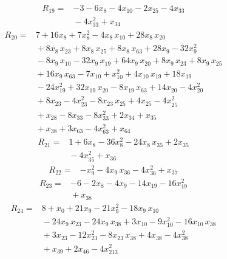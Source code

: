 \documentclass[11pt]{article}
\begin{document}
\begin{equation*}\begin{aligned}
R_{19}={}&-3 - 6x_{8} - 4x_{10} - 2x_{25} - 4x_{33} \\
&{} - 4x_{33}^{2} + x_{34}
\end{aligned}\end{equation*}
\begin{equation*}\begin{aligned}
R_{20}={}&7 + 16x_{8} + 7x_{8}^{2} - 4x_{8}\,x_{10} + 28x_{8}\,x_{20} \\
&{} + 8x_{8}\,x_{23} + 8x_{8}\,x_{25} + 8x_{8}\,x_{63} + 28x_{9} - 32x_{9}^{2} \\
&{} - 8x_{9}\,x_{10} - 32x_{9}\,x_{19} + 64x_{9}\,x_{20} + 8x_{9}\,x_{23} + 8x_{9}\,x_{25} \\
&{} + 16x_{9}\,x_{63} - 7x_{10} + x_{10}^{2} + 4x_{10}\,x_{19} + 18x_{19} \\
&{} - 24x_{19}^{2} + 32x_{19}\,x_{20} - 8x_{19}\,x_{63} + 14x_{20} - 4x_{20}^{2} \\
&{} + 8x_{23} - 4x_{23}^{2} - 8x_{23}\,x_{25} + 4x_{25} - 4x_{25}^{2} \\
&{} + x_{28} - 8x_{33} - 8x_{33}^{2} + 2x_{34} + x_{35} \\
&{} + x_{38} + 3x_{63} - 4x_{63}^{2} + x_{64}
\end{aligned}\end{equation*}
\begin{equation*}\begin{aligned}
R_{21}={}&1 + 6x_{8} - 36x_{8}^{2} - 24x_{8}\,x_{35} + 2x_{35} \\
&{} - 4x_{35}^{2} + x_{36}
\end{aligned}\end{equation*}
\begin{equation*}\begin{aligned}
R_{22}={}&-x_{9}^{2} - 4x_{9}\,x_{36} - 4x_{36}^{2} + x_{37}
\end{aligned}\end{equation*}
\begin{equation*}\begin{aligned}
R_{23}={}&-6 - 2x_{8} - 4x_{9} - 14x_{19} - 16x_{19}^{2} \\
&{} + x_{38}
\end{aligned}\end{equation*}
\begin{equation*}\begin{aligned}
R_{24}={}&8 + x_{0} + 21x_{9} - 21x_{9}^{2} - 18x_{9}\,x_{10} \\
&{} - 24x_{9}\,x_{23} - 24x_{9}\,x_{38} + 3x_{10} - 9x_{10}^{2} - 16x_{10}\,x_{38} \\
&{} + 3x_{23} - 12x_{23}^{2} - 8x_{23}\,x_{38} + 4x_{38} - 4x_{38}^{2} \\
&{} + x_{39} + 2x_{46} - 4x_{213}^{2}
\end{aligned}\end{equation*}
\end{document}
